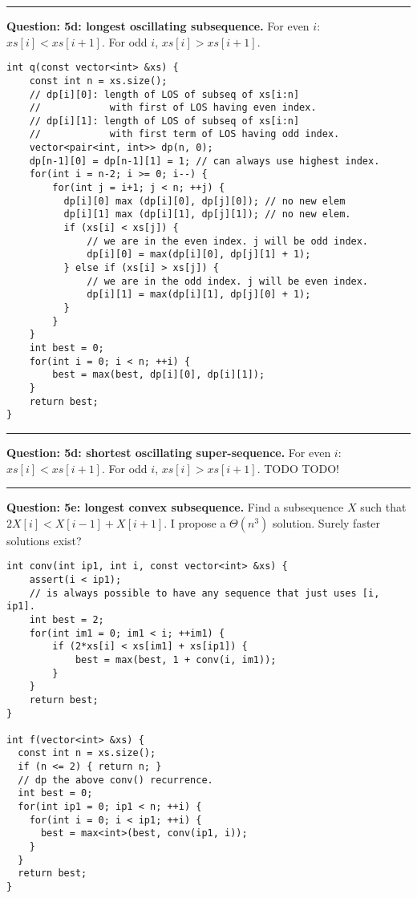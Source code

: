 \documentclass[14pt]{report}
\newcommand*{\question}[1]{\leavevmode\clearpage \par\noindent\rule{\textwidth}{0.4pt} \textbf{Question: #1.}}
\begin{document}
\question{5d: longest oscillating subsequence}
For even $i$: $xs[i] < xs[i+1]$. For odd $i$, $xs[i] > xs[i+1]$.
\begin{verbatim}
int q(const vector<int> &xs) {
    const int n = xs.size();
    // dp[i][0]: length of LOS of subseq of xs[i:n]
    //            with first of LOS having even index.
    // dp[i][1]: length of LOS of subseq of xs[i:n]
    //            with first term of LOS having odd index.
    vector<pair<int, int>> dp(n, 0);
    dp[n-1][0] = dp[n-1][1] = 1; // can always use highest index.
    for(int i = n-2; i >= 0; i--) {
        for(int j = i+1; j < n; ++j) {
          dp[i][0] max (dp[i][0], dp[j][0]); // no new elem
          dp[i][1] max (dp[i][1], dp[j][1]); // no new elem.
          if (xs[i] < xs[j]) {
              // we are in the even index. j will be odd index.
              dp[i][0] = max(dp[i][0], dp[j][1] + 1);
          } else if (xs[i] > xs[j]) {
              // we are in the odd index. j will be even index.
              dp[i][1] = max(dp[i][1], dp[j][0] + 1);
          }
        }
    }
    int best = 0;
    for(int i = 0; i < n; ++i) {
        best = max(best, dp[i][0], dp[i][1]);
    }
    return best;
}
\end{verbatim}

\question{5d: shortest oscillating super-sequence}
For even $i$: $xs[i] < xs[i+1]$. For odd $i$, $xs[i] > xs[i+1]$.
TODO TODO!

\question{5e: longest convex  subsequence}
Find a subsequence $X$ such that $2X[i] < X[i-1] + X[i+1]$. I propose
a $\Theta(n^3)$ solution. Surely faster solutions exist?

\begin{verbatim}
int conv(int ip1, int i, const vector<int> &xs) {
    assert(i < ip1);
    // is always possible to have any sequence that just uses [i, ip1].
    int best = 2;
    for(int im1 = 0; im1 < i; ++im1) {
        if (2*xs[i] < xs[im1] + xs[ip1]) {
            best = max(best, 1 + conv(i, im1));
        }
    }
    return best;
}

int f(vector<int> &xs) {
  const int n = xs.size();
  if (n <= 2) { return n; }
  // dp the above conv() recurrence.
  int best = 0;
  for(int ip1 = 0; ip1 < n; ++i) {
    for(int i = 0; i < ip1; ++i) {
      best = max<int>(best, conv(ip1, i));
    }
  }
  return best;
}
\end{verbatim}
\end{document}
